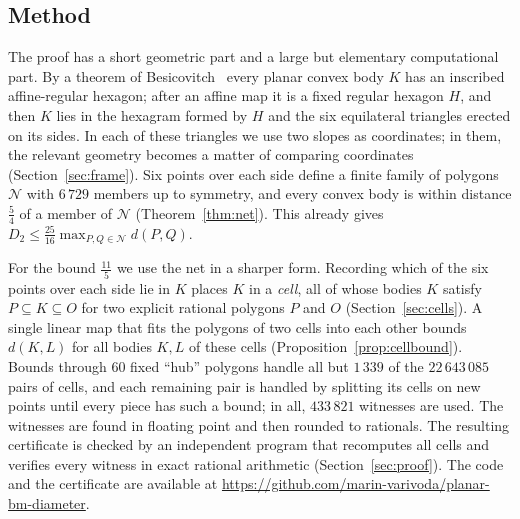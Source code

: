 \documentclass[11pt]{amsart}
\theoremstyle{definition}
\theoremstyle{remark}
\newcommand{\dBM}{d}
\newcommand{\N}{\mathcal N}
\begin{document}
\subsection*{Method}
The proof has a short geometric part and a large but elementary computational part.
By a theorem of Besicovitch~\cite{Besicovitch} every planar convex body $K$ has an inscribed affine-regular
hexagon; after an affine map it is a fixed regular hexagon $H$, and then $K$ lies in the hexagram formed by $H$
and the six equilateral triangles erected on its sides. In each of these triangles we use two slopes as
coordinates; in them, the relevant geometry becomes a matter of comparing coordinates
(Section~\ref{sec:frame}).
Six points over each side define a finite family of polygons $\N$ with $6\,729$ members up to symmetry, and every
convex body is within distance $\frac54$ of a member of $\N$ (Theorem~\ref{thm:net}). This
already gives $D_2\le\frac{25}{16}\max_{P,Q\in\N}\dBM(P,Q)$.

For the bound $\frac{11}5$ we use the net in a sharper form. Recording which of the six points over each side lie in
$K$ places $K$ in a \emph{cell}, all of whose bodies $K$ satisfy $P\subseteq K\subseteq O$ for two explicit
rational polygons $P$ and $O$ (Section~\ref{sec:cells}). A single linear map that fits the polygons of two cells
into each other bounds $\dBM(K,L)$ for all bodies $K,L$ of these cells (Proposition~\ref{prop:cellbound}). Bounds through
$60$ fixed ``hub'' polygons handle all but $1\,339$ of the $22\,643\,085$ pairs of cells, and each remaining pair is handled
by splitting its cells on new points until every piece has such a bound; in all, $433\,821$ witnesses are used. The witnesses are found in floating point and then
rounded to rationals. The resulting certificate is checked by an independent program that recomputes all cells and
verifies every witness in exact rational arithmetic (Section~\ref{sec:proof}). The code and the
certificate are available at \url{https://github.com/marin-varivoda/planar-bm-diameter}.
\end{document}
